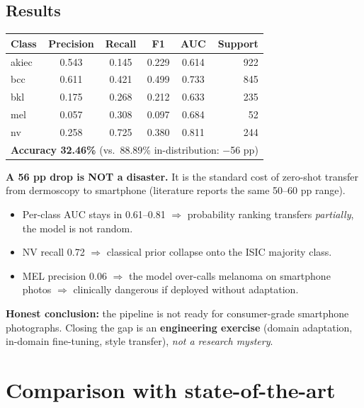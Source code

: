 \documentclass[11pt,a4paper]{article}
\begin{document}
\subsection{Results}

\begin{table}[h]
\centering\small
\begin{tabular}{lccccr}
\toprule
\textbf{Class} & \textbf{Precision} & \textbf{Recall} & \textbf{F1} & \textbf{AUC} & \textbf{Support} \\
\midrule
akiec & 0.543 & 0.145 & 0.229 & 0.614 & 922 \\
bcc   & 0.611 & 0.421 & 0.499 & 0.733 & 845 \\
bkl   & 0.175 & 0.268 & 0.212 & 0.633 & 235 \\
mel   & 0.057 & 0.308 & 0.097 & 0.684 &  52 \\
nv    & 0.258 & 0.725 & 0.380 & 0.811 & 244 \\
\midrule
\multicolumn{6}{l}{\textbf{Accuracy 32.46\%} (vs.\ 88.89\% in-distribution: $-$56 pp)} \\
\bottomrule
\end{tabular}
\end{table}

\begin{idea}
\textbf{A 56 pp drop is NOT a disaster.} It is the standard cost of zero-shot transfer from dermoscopy to smartphone (literature reports the same 50--60 pp range).
\begin{itemize}[leftmargin=*]
  \item Per-class AUC stays in 0.61--0.81 $\Rightarrow$ probability ranking transfers \textit{partially}, the model is not random.
  \item NV recall 0.72 $\Rightarrow$ classical prior collapse onto the ISIC majority class.
  \item MEL precision 0.06 $\Rightarrow$ the model over-calls melanoma on smartphone photos $\Rightarrow$ clinically dangerous if deployed without adaptation.
\end{itemize}
\textbf{Honest conclusion:} the pipeline is not ready for consumer-grade smartphone photographs. Closing the gap is an \textbf{engineering exercise} (domain adaptation, in-domain fine-tuning, style transfer), \textit{not a research mystery}.
\end{idea}

\section{Comparison with state-of-the-art}
\end{document}
